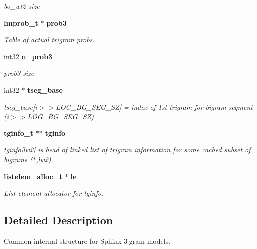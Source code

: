 \begin{CompactItemize}
\begin{CompactList}\small\item\em bo\_\-wt2 size \item\end{CompactList}\item 
{\bf lmprob\_\-t} $\ast$ {\bf prob3}\label{structlm3g__model__s_dc9ed2ad1f2daefdd40713a9dd371673}

\begin{CompactList}\small\item\em Table of actual trigram probs. \item\end{CompactList}\item 
int32 {\bf n\_\-prob3}\label{structlm3g__model__s_dd28369f51e657ee54deed5291c84d09}

\begin{CompactList}\small\item\em prob3 size \item\end{CompactList}\item 
int32 $\ast$ {\bf tseg\_\-base}\label{structlm3g__model__s_6cec34be6a748a9cece94ae3dfc1e8d7}

\begin{CompactList}\small\item\em tseg\_\-base[i$>$$>$LOG\_\-BG\_\-SEG\_\-SZ] = index of 1st trigram for bigram segment (i$>$$>$LOG\_\-BG\_\-SEG\_\-SZ) \item\end{CompactList}\item 
{\bf tginfo\_\-t} $\ast$$\ast$ {\bf tginfo}
\begin{CompactList}\small\item\em tginfo[lw2] is head of linked list of trigram information for some cached subset of bigrams ($\ast$,lw2). \item\end{CompactList}\item 
{\bf listelem\_\-alloc\_\-t} $\ast$ {\bf le}
\begin{CompactList}\small\item\em List element allocator for tginfo. \item\end{CompactList}\end{CompactItemize}


\subsection{Detailed Description}
Common internal structure for Sphinx 3-gram models. 


